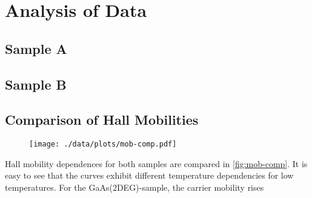 \chapter{Analysis of Data}

\section{Sample A}

\section{Sample B}

\section{Comparison of Hall Mobilities}
\begin{figure}
  \centering
  \texttt{[image: ./data/plots/mob-comp.pdf]}
  \label{fig:mob-comp}
\end{figure}

Hall mobility dependences for both samples are compared in \autoref{fig:mob-comp}.
It is easy to see that the curves exhibit different temperature dependencies for low temperatures.  
For the GaAs(2DEG)-sample, the carrier mobility rises

